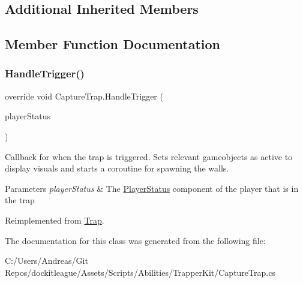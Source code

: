 \subsection*{Additional Inherited Members}


\subsection{Member Function Documentation}
\hypertarget{class_capture_trap_ac770502ec2d9a7e1fbc2ed4ce7f0ec8f}{}\label{class_capture_trap_ac770502ec2d9a7e1fbc2ed4ce7f0ec8f} 
\subsubsection{\texorpdfstring{Handle\+Trigger()}{HandleTrigger()}}
{\footnotesize\ttfamily override void Capture\+Trap.\+Handle\+Trigger (\begin{DoxyParamCaption}\item[{\hyperlink{class_player_status}{Player\+Status}}]{player\+Status }\end{DoxyParamCaption})\hspace{0.3cm}{\ttfamily [virtual]}}



Callback for when the trap is triggered. Sets relevant gameobjects as active to display visuals and starts a coroutine for spawning the walls. 


\begin{DoxyParams}{Parameters}
{\em player\+Status} & The \hyperlink{class_player_status}{Player\+Status} component of the player that is in the trap\\
\hline
\end{DoxyParams}


Reimplemented from \hyperlink{class_trap_a2e92a6f420a5d21a132108d8dd3ca5de}{Trap}.



The documentation for this class was generated from the following file\+:\begin{DoxyCompactItemize}
\item 
C\+:/\+Users/\+Andreas/\+Git Repos/dockitleague/\+Assets/\+Scripts/\+Abilities/\+Trapper\+Kit/Capture\+Trap.\+cs\end{DoxyCompactItemize}
